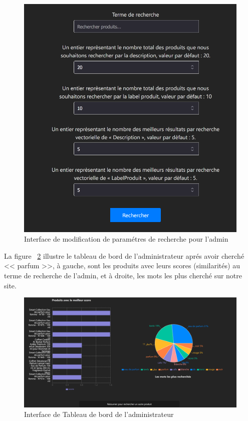 \begin{figure}[H]
    \centering
    \includegraphics[width=1\textwidth]{logos/knnsearchform.png}
    \caption{Interface de modification de paramétres de recherche pour l'admin}
    \label{fig:knnsearchform}
\end{figure}


\noindent
La figure ~\ref{fig:admindashboard} illustre le tableau de bord de l'administrateur aprés avoir cherché << parfum >>, à gauche, sont les produits avec leurs scores (similarités) au terme de recherche de l'admin, et à droite, les mots les plus cherché sur notre site.

\begin{figure}[H]
    \centering
    \includegraphics[width=1\textwidth]{logos/dashboard.png}
    \caption{Interface de Tableau de bord de l'administrateur}
    \label{fig:admindashboard}
\end{figure}


